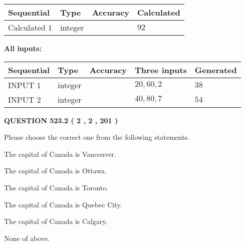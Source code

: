 \documentclass[12pt]{article}
\begin{document}
   
   
   
\noindent{}
   
   
  
  
\noindent\begin{tabular}{|l|l|l|l|}
\hline
 Sequential & Type & Accuracy & Calculated \\ 
\hline
 
 
  Calculated $  1 $ & integer &  & 
  $ 92 $ 
 \\  \hline  
 \end{tabular}
   
   
   
   
\noindent\vspace{0.1in}\hspace{-0.08in} {\textbf{\Large{All inputs: }}}
   
   
  
  
\noindent\begin{tabular}{|l|l|l|l|l|}
\hline
 Sequential & Type & Accuracy & Three inputs & Generated \\ 
\hline
 
 
  INPUT $  1 $ & integer &  & $
 20
 , 
 60
 , 
 2
 $ & $ 38 $ 
 \\  \hline  
 
 
  INPUT $  2 $ & integer &  & $
 40
 , 
 80
 , 
 7
 $ & $ 54 $ 
 \\  \hline  
 \end{tabular}
   
   
  
\vspace{0.2in}
  
{\textbf{\Large{QUESTION
523.2 
 ( 2 , 2 , 201 )
}}}
  
  
Please choose the correct one from the following statements.
 
 
The capital of Canada is Vancouver.
 
 
The capital of Canada is Ottawa.
 
 
The capital of Canada is Toronto.
 
 
The capital of Canada is Quebec City.
 
 
The capital of Canada is Calgary.
 
 
 None of above.
 
 
\noindent{}
 
\end{document}
